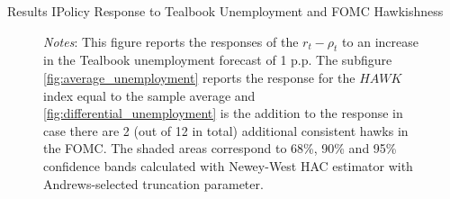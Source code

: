 \documentclass[11pt,pdf,aspectratio=129]{beamer}
\begin{document}
\begin{frame}{Results I}{Policy Response to Tealbook Unemployment and FOMC Hawkishness}
\begin{figure}[!htbp]
\begin{subfigure}[b]{0.49\textwidth}
        \end{subfigure}\vspace{-4ex}
            {\begin{flushleft}\tiny\textit{Notes}: This figure reports the responses of the $r_t-\rho_t$ to an increase in the Tealbook unemployment forecast of 1 p.p. The subfigure \ref{fig:average_unemployment} reports the response for the $\mathit{HAWK}$ index equal to the sample average and \ref{fig:differential_unemployment} is the addition to the response in case there are 2 (out of 12 in total) additional consistent hawks in the FOMC. The shaded areas correspond to 68\%, 90\% and 95\% confidence bands calculated with Newey-West HAC estimator with Andrews-selected truncation parameter.\end{flushleft}}
    \end{figure}
    
\end{frame}
\end{document}
